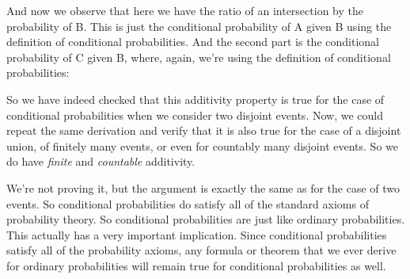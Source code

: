 \documentclass[pdftex, brazil, 12pt, twoside]{article}
\begin{document}
\begin{figure}[H]
  \begin{center}
  \end{center}
\end{figure}

And now we observe that here we have the ratio of an
intersection by the probability of B. This is just
the conditional probability of A given B using the definition
of conditional probabilities.
And the second part is the conditional probability of C
given B, where, again, we're using the definition of
conditional probabilities:

\begin{figure}[H]
  \begin{center}
  \end{center}
\end{figure}

So we have indeed checked that this additivity property is
true for the case of conditional probabilities when
we consider two disjoint events.
Now, we could repeat the same derivation and verify that it
is also true for the case of a disjoint union, of finitely
many events, or even for countably
many disjoint events.
So we do have \emph{finite} and \emph{countable} additivity.

We're not proving it, but the argument is exactly the same
as for the case of two events.
So conditional probabilities do satisfy all of the standard
axioms of probability theory.
So conditional probabilities are just like ordinary
probabilities.
This actually has a very important implication.
Since conditional probabilities satisfy all of
the probability axioms, any formula or theorem that we
ever derive for ordinary probabilities will remain true
for conditional probabilities as well.
\end{document}
